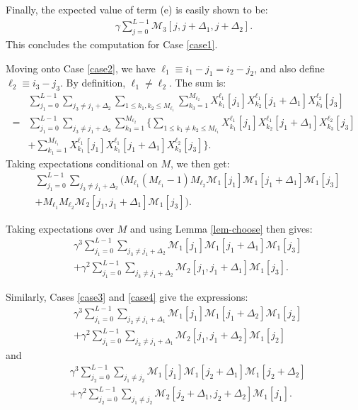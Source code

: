 \documentclass[12pt]{article}
\newcommand{\1}{\mathbf{1}}
\newcommand{\M}{\mathcal{M}}
\theoremstyle{plain}
\theoremstyle{definition}
\theoremstyle{remark}
\theoremstyle{plain}
\theoremstyle{remark}
\theoremstyle{plain}
\theoremstyle{plain}
\theoremstyle{plain}
\numberwithin{equation}{section}
\begin{document}
Finally, the expected value of term (e) is easily shown to be:
%
\begin{align} \label{eeee}
%
\gamma \sum_{j=0}^{L-1} \M_3[j,j+\Delta_1,j+\Delta_2].
%
\end{align}
%
This concludes the computation for Case \ref{case1}.

Moving onto Case \ref{case2}, we have $\ell_1 \equiv i_1 - j_1 = i_2 - j_2$, and also define $\ell_2 \equiv i_3 - j_3$. By definition, $\ell_1 \ne \ell_2$. The sum is:
%
\begin{align}
%
& \sum_{j_1=0}^{L-1} \sum_{j_3 \ne j_1 + \Delta_2}
\sum_{1 \le k_1,k_2 \le M_{\ell_1}} \sum_{k_3=1}^{M_{\ell_2}}
X_{k_1}^{\ell_1}[j_1] X_{k_2}^{\ell_1}[j_1 + \Delta_1] X_{k_3}^{\ell_2}[j_3]   
\nonumber \\
=& \sum_{j_1=0}^{L-1} \sum_{j_3 \ne j_1 + \Delta_2} \sum_{k_3=1}^{M_{\ell_2}}
\Bigg\{
\sum_{1 \le k_1 \ne k_2 \le M_{\ell_1}} 
X_{k_1}^{\ell_1}[j_1] X_{k_2}^{\ell_1}[j_1 + \Delta_1] X_{k_3}^{\ell_2}[j_3]
\nonumber \\
&       + \sum_{k_1=1}^{M_{\ell_1}} X_{k_1}^{\ell_1}[j_1] X_{k_1}^{\ell_1}[j_1 + \Delta_1] 
X_{k_3}^{\ell_2}[j_3]  \Bigg\}.
%
\end{align}
%
Taking expectations conditional on $M$, we then get:
%
\begin{align}
%
& \sum_{j_1=0}^{L-1} \sum_{j_3 \ne j_1 + \Delta_2} 
\Bigg(M_{\ell_1} (M_{\ell_1}-1) M_{\ell_2} \M_1[j_1] \M_1[j_1 + \Delta_1] \M_1[j_3]
\nonumber \\
&       + M_{\ell_1} M_{\ell_2} \M_2[j_1,j_1+\Delta_1] \M_1[j_3] \Bigg).
%
\end{align}

Taking expectations over $M$ and using Lemma \ref{lem-choose} then gives:
%
\begin{align}
%
& \gamma^3 \sum_{j_1=0}^{L-1} \sum_{j_3 \ne j_1 + \Delta_2} 
\M_1[j_1] \M_1[j_1 + \Delta_1] \M_1[j_3]
\label{ffff} \\
& + \gamma^2 \sum_{j_1=0}^{L-1} \sum_{j_3 \ne j_1 + \Delta_2}  
\M_2[j_1,j_1+\Delta_1] \M_1[j_3].
\label{gggg}
%
\end{align}


Similarly, Cases \ref{case3} and \ref{case4} give the expressions:
%
\begin{align}
%
& \gamma^3 \sum_{j_1=0}^{L-1} \sum_{j_2 \ne j_1 + \Delta_1} 
\M_1[j_1] \M_1[j_1 + \Delta_2] \M_1[j_2]
\label{hhhh} \\
& + \gamma^2 \sum_{j_1=0}^{L-1} \sum_{j_2 \ne j_1 + \Delta_1}  
\M_2[j_1,j_1+\Delta_2] \M_1[j_2]
\label{iiii}
%
\end{align}
%
and
%
\begin{align}
%
& \gamma^3 \sum_{j_2=0}^{L-1} \sum_{j_1 \ne j_2} 
\M_1[j_1] \M_1[j_2 + \Delta_1] \M_1[j_2 + \Delta_2]
\label{jjjj}\\
& + \gamma^2 \sum_{j_2=0}^{L-1} \sum_{j_1 \ne j_2}  
\M_2[j_2+\Delta_1,j_2+\Delta_2] \M_1[j_1].
\label{kkkk}
%
\end{align}
\end{document}
